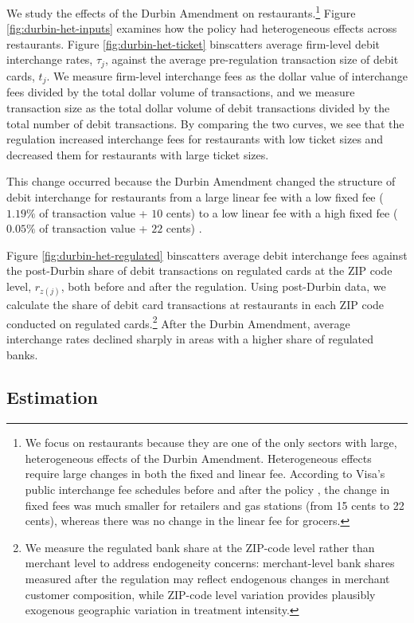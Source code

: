 \documentclass[main.tex]{subfiles}
\begin{document}
We study the effects of the Durbin Amendment on restaurants.\footnote{We focus on restaurants because they are one of the only sectors with large, heterogeneous effects of the Durbin Amendment.
Heterogeneous effects require large changes in both the fixed and linear fee.
According to Visa's public interchange fee schedules before and after the policy \citep{Visa2010}, the change in fixed fees was much smaller for retailers and gas stations (from 15 cents to 22 cents), whereas there was no change in the linear fee for grocers. } Figure \ref{fig:durbin-het-inputs} examines how the policy had heterogeneous effects across restaurants.
Figure \ref{fig:durbin-het-ticket} binscatters average firm-level debit interchange rates, $\tau_j$, against the average pre-regulation transaction size of debit cards, $t_j$.
We measure firm-level interchange fees as the dollar value of interchange fees divided by the total dollar volume of transactions, and we measure transaction size as the total dollar volume of debit transactions divided by the total number of debit transactions.
By comparing the two curves, we see that the regulation increased interchange fees for restaurants with low ticket sizes and decreased them for restaurants with large ticket sizes.

This change occurred because the Durbin Amendment changed the structure of debit interchange for restaurants from a large linear fee with a low fixed fee ($1.19\%$ of transaction value + $10$ cents) to a low linear fee with a high fixed fee ($0.05\%$ of transaction value + $22$ cents) \citep{Visa2010}.

Figure \ref{fig:durbin-het-regulated} binscatters average debit interchange fees against the post-Durbin share of debit transactions on regulated cards at the ZIP code level, $r_{z(j)}$, both before and after the regulation.
Using post-Durbin data, we calculate the share of debit card transactions at restaurants in each ZIP code conducted on regulated cards.\footnote{ We measure the regulated bank share at the ZIP-code level rather than merchant level to address endogeneity concerns: merchant-level bank shares measured after the regulation may reflect endogenous changes in merchant customer composition, while ZIP-code level variation provides plausibly exogenous geographic variation in treatment intensity. } After the Durbin Amendment, average interchange rates declined sharply in areas with a higher share of regulated banks.

\subsection{Estimation}
\end{document}
